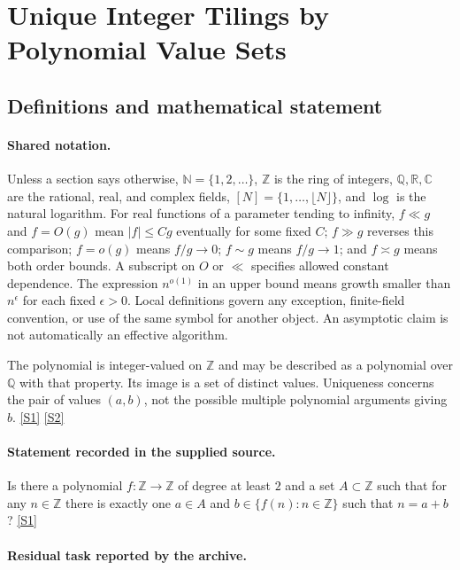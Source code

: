 \documentclass[11pt,a4paper]{article}
\newcommand{\N}{\mathbb{N}}
\newcommand{\Z}{\mathbb{Z}}
\newcommand{\Q}{\mathbb{Q}}
\newcommand{\R}{\mathbb{R}}
\newcommand{\C}{\mathbb{C}}
\newcommand{\sref}[2]{\hyperlink{source:#1:#2}{[S#2]}}
\begin{document}
\section{Unique Integer Tilings by Polynomial Value Sets}\label{statement}


\subsection{Definitions and mathematical statement}

\paragraph{Shared notation.}Unless a section says otherwise, $\N=\{1,2,\ldots\}$,
$\Z$ is the ring of integers, $\Q,\R,\C$ are the rational, real, and complex
fields, $[N]=\{1,\ldots,\lfloor N\rfloor\}$, and $\log$ is the natural
logarithm. For real functions of a parameter tending to infinity,
$f\ll g$ and $f=O(g)$ mean $|f|\leq Cg$ eventually for some fixed $C$;
$f\gg g$ reverses this comparison; $f=o(g)$ means $f/g\to0$;
$f\sim g$ means $f/g\to1$; and $f\asymp g$ means both order bounds.
A subscript on $O$ or $\ll$ specifies allowed constant dependence.
The expression $n^{o(1)}$ in an upper bound means growth smaller than
$n^\epsilon$ for each fixed $\epsilon>0$. Local definitions govern any
exception, finite-field convention, or use of the same symbol for another
object. An asymptotic claim is not automatically an effective algorithm.



The polynomial is integer-valued on $\Z$ and may be described as a polynomial over $\Q$ with that property. Its image is a set of distinct values. Uniqueness concerns the pair of values $(a,b)$, not the possible multiple polynomial arguments giving $b$. \sref{statement}{1} \sref{statement}{2}

\paragraph{Statement recorded in the supplied source.}
Is there a polynomial $f:\mathbb{Z}\to \mathbb{Z}$ of degree at least $2$ and a set $A\subset \mathbb{Z}$ such that for any $n\in \mathbb{Z}$ there is exactly one $a\in A$ and $b\in \{ f(n) : n\in\mathbb{Z}\}$ such that $n=a+b$? \sref{statement}{1}

\paragraph{Residual task reported by the archive.}
\end{document}
